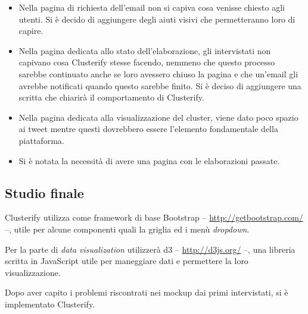 	\begin{itemize}
		\item  Nella pagina di richiesta dell'email non si capiva cosa venisse chiesto agli utenti. Si è decido di aggiungere degli aiuti visivi che permetteranno loro di capire.
            
            	\item Nella pagina dedicata allo stato dell'elaborazione, gli intervistati non capivano cosa Clusterify stesse facendo, nemmeno che questo processo sarebbe continuato anche se loro avessero chiuso la pagina e che un'email gli avrebbe notificati quando questo sarebbe finito. Si è deciso di aggiungere una scritta che chiarirà il comportamento di Clusterify. 
                        
            	\item Nella pagina dedicata alla visualizzazione del cluster, viene dato poco spazio ai tweet mentre questi dovrebbero essere l'elemento fondamentale della piattaforma.
            
            	\item Si è notata la necessità di avere una pagina con le elaborazioni passate.
            \end{itemize}
            

\subsection{Studio finale}        
	Clusterify utilizza come framework di base Bootstrap -- \url{http://getbootstrap.com/} --, utile per alcune componenti quali la griglia ed i menù \emph{dropdown}.
        
	Per la parte di \emph{data visualization} utilizzerà d3 -- \url{http://d3js.org/} --, una libreria scritta in JavaScript utile per maneggiare dati e permettere la loro visualizzazione.
        
	Dopo aver capito i problemi riscontrati nei mockup dai primi intervistati, si è implementato Clusterify.

